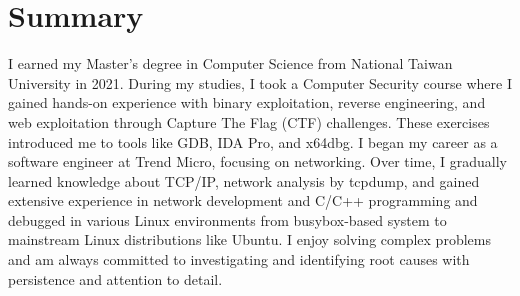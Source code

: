 \section{Summary}
I earned my Master’s degree in Computer Science from National Taiwan University in 2021. During my studies, I took a Computer Security course where I gained hands-on experience with binary exploitation, reverse engineering, and web exploitation through Capture The Flag (CTF) challenges. These exercises introduced me to tools like GDB, IDA Pro, and x64dbg. I began my career as a software engineer at Trend Micro, focusing on networking. Over time, I gradually learned knowledge about TCP/IP, network analysis by tcpdump, and gained extensive experience in network development and C/C++ programming and debugged in various Linux environments from busybox-based system to mainstream Linux distributions like Ubuntu.
I enjoy solving complex problems and am always committed to investigating and identifying root causes with persistence and attention to detail.
